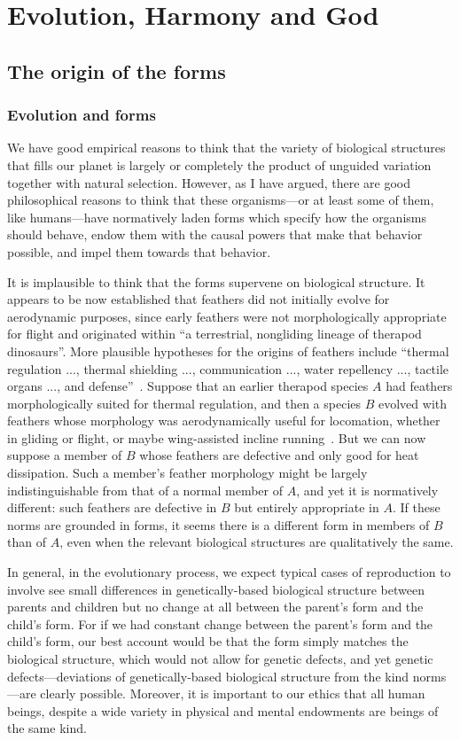 \def\mychapter{XI}

\chapter{Evolution, Harmony and God}\label{ch:God}
\section{The origin of the forms}
\subsection{Evolution and forms}
We have good empirical reasons to think that the variety of biological structures that fills our planet 
is largely or completely the product of unguided variation together with natural selection. However, as
I have argued, there are good philosophical reasons to think that these organisms---or at least some of
them, like humans---have normatively laden forms which specify how the organisms should behave, endow them with the causal
powers that make that behavior possible, and impel them towards that behavior. 

It is implausible to think that the forms supervene on biological structure. It appears to be now established
that feathers did not initially evolve for aerodynamic purposes, since early feathers were not morphologically
appropriate for flight and originated within ``a terrestrial, nongliding lineage of therapod 
dinosaurs''. More plausible hypotheses for the origins of feathers include
``thermal regulation ..., thermal shielding ..., communication ..., water repellency ..., tactile organs ...,
and defense''~\parencite[284--285]{PrumBrush}. Suppose that an earlier therapod species $A$ had feathers 
morphologically suited for thermal regulation, and then 
a species $B$ evolved with feathers whose morphology was aerodynamically useful for locomation, whether in
gliding or flight, or maybe wing-assisted incline running~\parencite{DialWAIR}. But we can now suppose a member 
of $B$ whose feathers are defective and only good for heat dissipation. Such a member's feather morphology
might be largely indistinguishable from that of a normal member of $A$, and yet it is normatively different: such 
feathers are defective in $B$ but entirely
appropriate in $A$. If these norms are grounded in forms, it seems there is a different form in members of $B$ than
of $A$, even when the relevant biological structures are qualitatively the same.

In general, in the evolutionary process, we expect typical cases of reproduction to involve see small differences in genetically-based biological structure 
between parents and children but no change at all between the parent's form and the child's form. For if we had constant change
between the parent's form and the child's form, our best account would be that the form simply matches the
biological structure, which would not allow for genetic defects, and yet genetic defects---deviations of genetically-based
biological structure from the kind norms---are clearly possible.  Moreover, it is important to our ethics
that all human beings, despite a wide variety in physical and mental endowments are beings of the same kind. 

